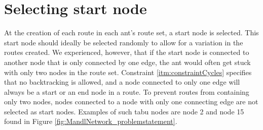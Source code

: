 \section{Selecting start node}

At the creation of each route in each ant's route set, a start node is selected. This start node should ideally be selected randomly to allow for a variation in the routes created. We experienced, however, that if the start node is connected to another node that is only connected by one edge, the ant would often get stuck with only two nodes in the route set. Constraint \vref{itm:constraintCycles} specifies that no backtracking is allowed, and a node connected to only one edge will always be a start or an end node in a route. To prevent routes from containing only two nodes, nodes connected to a node with only one connecting edge are not selected as start nodes. Examples of such tabu nodes are node 2 and node 15 found in Figure \vref{fig:MandlNetwork_problemstatement}. 
